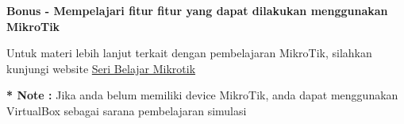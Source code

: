 \documentclass{article}
\begin{document}
    \begin{flushleft}
        \textbf{Bonus - Mempelajari fitur fitur yang dapat dilakukan menggunakan MikroTik}
        \newline

        Untuk materi lebih lanjut terkait dengan pembelajaran MikroTik, silahkan kunjungi website 
        \href{https://www.youtube.com/playlist?list=PLvT7-AKYOYMxXuwYv1uA9e0aDsX1XgF4l}{Seri Belajar Mikrotik}\\

        \begin{center}
            \footnotesize\textbf{* Note :} Jika anda belum memiliki device MikroTik, anda dapat 
            menggunakan VirtualBox sebagai sarana pembelajaran simulasi\\
        \end{center}

    \end{flushleft}




 
\end{document}
